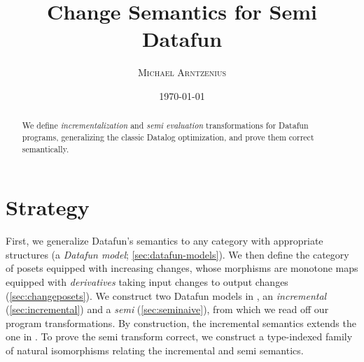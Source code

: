 \documentclass{rntz}\usepackage{fantasy}\geometry{textwidth=330pt,}
\title{Change Semantics for Semi\naive{} Datafun}
\author{\scshape Michael Arntzenius}
\date{\today}
\begin{document}

\maketitle

\begin{abstract}
  We define \emph{incrementalization} and \emph{semi\naive{} evaluation}
  transformations for Datafun programs, generalizing the classic Datalog
  optimization, and prove them correct semantically.%
\end{abstract}


\section{Strategy}

First, we generalize Datafun's \Poset{} semantics to any category with
appropriate structures (a \emph{Datafun model}; \cref{sec:datafun-models}). We
then define the category \CP{} of posets equipped with increasing changes, whose
morphisms are monotone maps equipped with \emph{derivatives} taking input
changes to output changes (\cref{sec:changeposets}). We construct two Datafun
models in \CP{}, an \emph{incremental} (\cref{sec:incremental}) and a
\emph{semi\naive} (\cref{sec:seminaive}), from which we read off our program
transformations. By construction, the incremental semantics extends the one in
\Poset{}. To prove the semi\naive{} transform correct, we construct a
type-indexed family of natural isomorphisms relating the incremental and
semi\naive{} semantics.

\end{document}
